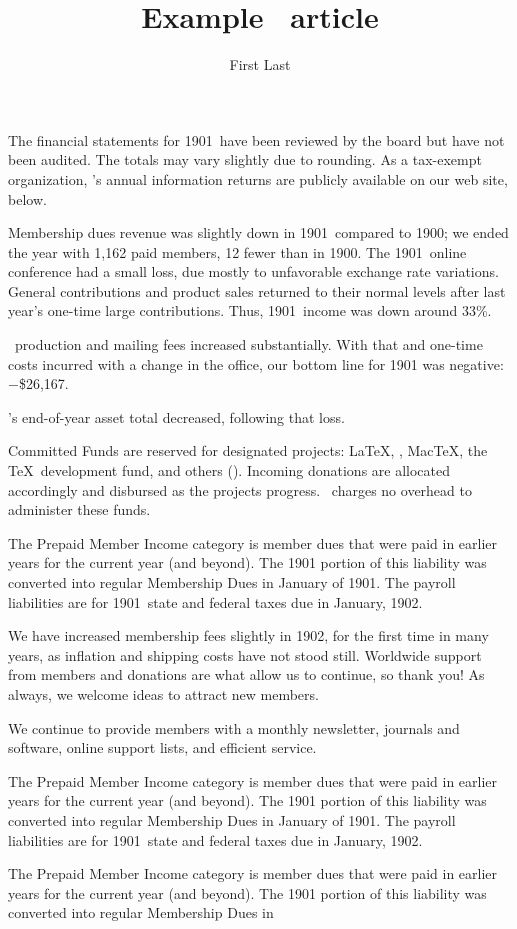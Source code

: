 \documentclass[final,runningminimal]{ltugboat}
\title{Example \TUB\ article}
\author{First Last}
\begin{document}
\maketitle

\def\lyearnn{00}\def\lyear{19\lyearnn}
\def\fyearnn{01}\def\fyear{19\fyearnn}
\def\nyearnn{02}\def\nyear{19\nyearnn}

The financial statements for \fyear\ have been reviewed by the \TUG{}
board but have not been audited. The totals may vary slightly due to
rounding. As a  tax-exempt organization, \TUG's annual
information returns are publicly available on our web site, below.

Membership dues revenue was slightly down in \fyear\ compared to
\lyear{}; we ended the year with 1,162 paid members, 12 fewer than in
\lyear. The \fyear\ online conference had a small loss, due mostly to
unfavorable exchange rate variations. General contributions and product
sales returned to their normal levels after last year's one-time large
contributions. Thus, \fyear\ income was down around 33\%.

\TUB\ production and mailing fees increased substantially. With that and
one-time costs incurred with a change in the office, our bottom line for
\fyear{} was negative: $-$\$26,167.

\TUG's end-of-year asset total decreased, following that loss.

Committed Funds are reserved for designated projects: \LaTeX, \CTAN,
Mac\TeX, the \TeX\ development fund, and others
().
Incoming donations are allocated accordingly and disbursed as the
projects progress.
\TUG\ charges no overhead to administer these funds.

The Prepaid Member Income category is member dues that were paid in
earlier years for the current year (and beyond). The \fyear{} portion of
this liability was converted into regular Membership Dues in January of
\fyear{}. The payroll liabilities are for \fyear\ state and federal
taxes due in January, \nyear{}.

We have increased membership fees slightly in \nyear, for the first time
in many years, as inflation and shipping costs have not stood still.
Worldwide support from members and donations are what allow us to
continue, so thank you! As always, we welcome ideas to attract new
members.

We continue to provide members with a monthly newsletter, journals and
software, online support lists, and efficient service.

The Prepaid Member Income category is member dues that were paid in
earlier years for the current year (and beyond). The \fyear{} portion of
this liability was converted into regular Membership Dues in January of
\fyear{}. The payroll liabilities are for \fyear\ state and federal
taxes due in January, \nyear{}.

The Prepaid Member Income category is member dues that were paid in
earlier years for the current year (and beyond). The \fyear{} portion of
this liability was converted into regular Membership Dues in

\loggingall
\end{document}
